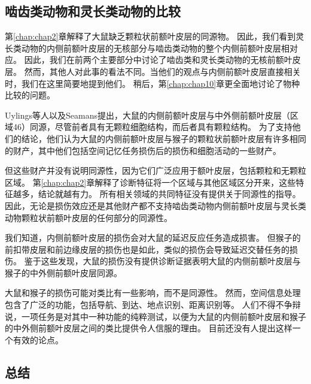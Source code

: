 \subsection{啮齿类动物和灵长类动物的比较}

第\ref{chap:chap2}章解释了大鼠缺乏颗粒状前额叶皮层的同源物。
因此，我们看到灵长类动物的内侧前额叶皮层的无核部分与啮齿类动物的整个内侧前额叶皮层相对应。
因此，我们在前两个主要部分中讨论了啮齿类和灵长类动物的无核前额叶皮层。
然而，其他人对此事的看法不同。当他们的观点与内侧前额叶皮层直接相关时，我们在这里简要地提到他们。
稍后，第\ref{chap:chap10}章更全面地讨论了物种比较的问题。\par


Uylings等人\cite{uylings2003rats}以及Seamans\cite{seamans2008comparing}提出，大鼠的内侧前额叶皮层与中外侧前额叶皮层（区域46）同源，尽管前者具有无颗粒细胞结构，而后者具有颗粒结构。
为了支持他们的结论，他们认为大鼠的内侧前额叶皮层与猴子的颗粒状前额叶皮层有许多相同的财产，其中他们包括空间记忆任务损伤后的损伤和细胞活动的一些财产。\par


但这些财产并没有说明同源性，因为它们广泛应用于额叶皮层，包括颗粒和无颗粒区域。
第\ref{chap:chap2}章解释了诊断特征将一个区域与其他区域区分开来，这些特征越多，结论就越有力。
所有相关领域的共同特征没有提供关于同源性的指导。
因此，无论是损伤效应还是其他财产都不支持啮齿类动物内侧前额叶皮层与灵长类动物颗粒状前额叶皮层的任何部分的同源性。\par


我们知道，内侧前额叶皮层的损伤会对大鼠的延迟反应任务造成损害\cite{kolb1974double}。
但猴子的前扣带皮层和前边缘皮层的损伤也是如此\cite{meunier1997effects}，类似的损伤会导致延迟交替任务的损伤\cite{rushworth2003effect}。
鉴于这些发现，大鼠的损伤没有提供诊断证据表明大鼠的内侧前额叶皮层与猴子的中外侧前额叶皮层同源。\par


大鼠和猴子的损伤可能对类比有一些影响，而不是同源性\cite{brown2002rodent}。
然而，空间信息处理包含了广泛的功能，包括导航、到达、地点识别、距离识别等。
人们不得不争辩说，一项任务是对其中一种功能的纯粹测试，以便为大鼠的内侧前额叶皮层和猴子的中外侧前额叶皮层之间的类比提供令人信服的理由。
目前还没有人提出这样一个有效的论点。\par



\subsection{总结}

